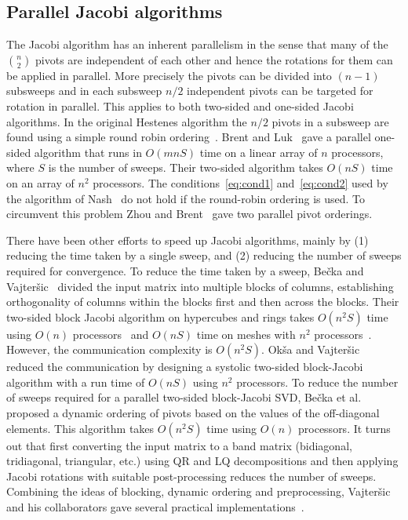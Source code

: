 \documentclass[10pt, conference, compsocconf]{IEEEtran}
\begin{document}
\subsection{Parallel Jacobi algorithms}
\label{sec:paralgo}
 
The Jacobi algorithm has an inherent parallelism in the sense that many of the ${n \choose 2}$ pivots are independent of each other and hence the rotations for them can be applied in parallel. More precisely the pivots can be divided into $(n{-}1)$ subsweeps and in each subsweep $n/2$ independent pivots can be targeted for rotation in parallel. This applies to both two-sided and one-sided Jacobi algorithms. In the original Hestenes algorithm the $n/2$ pivots in a subsweep are found using a simple round robin ordering~\cite{golub2012matrix}. Brent and Luk~\cite{brent1985solution} gave a parallel one-sided algorithm that runs in $O(mnS)$ time on a linear array of $n$ processors, where $S$ is the number of sweeps. Their two-sided algorithm takes $O(nS)$ time on an array of $n^2$ processors. The conditions~\eqref{eq:cond1} and~\eqref{eq:cond2} used by the algorithm of Nash~\cite{nash1975one} do not hold if the round-robin ordering is used. To circumvent this problem Zhou and Brent~\cite{zhou1995parallel} gave two parallel pivot orderings.

There have been other efforts to speed up Jacobi algorithms, mainly by (1) reducing the time taken by a single sweep, and (2) reducing the number of sweeps required for convergence.  To reduce the time taken by a sweep, Be{\v{c}}ka and Vajter{\v{s}}ic~\cite{bevcka1999blocka, bevcka1999blockb} divided the input matrix into multiple blocks of columns, establishing orthogonality of columns within the blocks first and then across the blocks. Their two-sided block Jacobi algorithm on hypercubes and rings takes $O(n^2 S)$ time using $O(n)$ processors~\cite{bevcka1999blocka} and $O(nS)$ time on meshes with $n^2$ processors~\cite{bevcka1999blockb}. However, the communication complexity is $O(n^2 S)$. Ok{\v{s}}a and Vajter{\v{s}}ic~\cite{okvsa2003special} reduced the communication by designing a systolic two-sided block-Jacobi algorithm with a run time of $O(nS)$ using $n^2$ processors. To reduce the number of sweeps required for a parallel two-sided block-Jacobi SVD, Be{\v{c}}ka et al.~\cite{bevcka2002dynamic} proposed a dynamic ordering of pivots based on the values of the off-diagonal elements. This algorithm takes $O(n^2 S)$ time using $O(n)$ processors. It turns out that first converting the input matrix to a band matrix (bidiagonal, tridiagonal, triangular, etc.) using QR and LQ decompositions and then applying Jacobi rotations with suitable post-processing reduces the number of sweeps. Combining the ideas of blocking, dynamic ordering and preprocessing, Vajter{\v{s}}ic and his collaborators gave several practical implementations~\cite{bevcka2013parallel, kudo2016parallel}.
\end{document}
